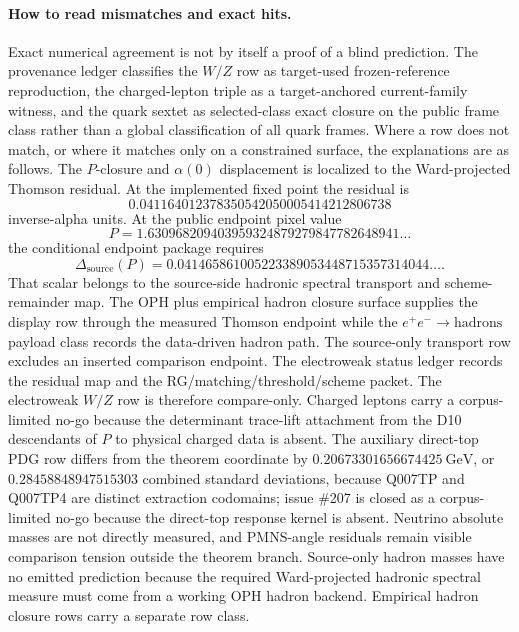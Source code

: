 \documentclass[11pt]{article}
\begin{document}
\paragraph{How to read mismatches and exact hits.}
Exact numerical agreement is not by itself a proof of a blind prediction. The provenance
ledger classifies the \(W/Z\) row as target-used frozen-reference reproduction, the charged-lepton
triple as a target-anchored current-family witness, and the quark sextet as selected-class exact
closure on the public frame class rather than a global classification of all quark frames. Where a
row does not match, or where it matches only on a constrained surface, the explanations are
as follows. The \(P\)-closure and \(\alpha(0)\) displacement is localized to the Ward-projected
Thomson residual. At the implemented fixed point the residual is
\[
0.041164012378350542050005414212806738
\]
inverse-alpha units. At the public endpoint pixel value
\[
P=1.630968209403959324879279847782648941\ldots
\]
the conditional endpoint package requires
\[
\Delta_{\mathrm{source}}(P)=0.041465861005223389053448715357314044\ldots.
\]
That scalar belongs to the source-side hadronic spectral transport and
scheme-remainder map. The OPH plus empirical hadron closure surface supplies
the display row through the measured Thomson endpoint while the
\(e^+e^-\to\mathrm{hadrons}\) payload class records the data-driven hadron
path. The source-only transport row excludes an inserted comparison endpoint. The
electroweak status ledger records the residual map and the
RG/matching/threshold/scheme packet.
The electroweak \(W/Z\) row is therefore compare-only. Charged leptons carry a corpus-limited
no-go because the determinant trace-lift attachment from the D10 descendants of \(P\) to physical charged data is absent. The auxiliary
direct-top PDG row differs from the theorem coordinate by \(0.20673301656674425~\mathrm{GeV}\),
or \(0.28458848947515303\) combined standard deviations, because Q007TP and Q007TP4 are distinct
extraction codomains; issue \#207 is closed as a corpus-limited no-go because the direct-top response kernel is absent. Neutrino absolute masses are
not directly measured, and PMNS-angle residuals remain visible comparison tension outside the
theorem branch. Source-only hadron masses have no emitted prediction because the
required Ward-projected hadronic spectral measure must come from a working OPH
hadron backend. Empirical hadron closure rows carry a separate row class.
\end{document}
